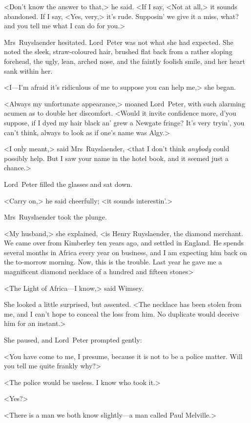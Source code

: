 <Don't know the answer to that,> he said. <If I say, <Not at all,> it sounds abandoned. If I say, <Yes, very,> it's rude. Supposin' we give it a miss, what? and you tell me what I can do for you.>

Mrs~Ruyslaender hesitated. Lord~Peter was not what she had expected. She noted the sleek, straw-coloured hair, brushed flat back from a rather sloping forehead, the ugly, lean, arched nose, and the faintly foolish smile, and her heart sank within her.

<I—I'm afraid it's ridiculous of me to suppose you can help me,> she began.

<Always my unfortunate appearance,> moaned Lord~Peter, with such alarming acumen as to double her discomfort. <Would it invite confidence more, d'you suppose, if I dyed my hair black an' grew a Newgate fringe? It's very tryin', you can't think, always to look as if one's name was Algy.>

<I only meant,> said Mrs~Ruyslaender, <that I don't think \emph{anybody} could possibly help. But I saw your name in the hotel book, and it seemed just a chance.>

Lord~Peter filled the glasses and sat down.

<Carry on,> he said cheerfully; <it sounds interestin'.>

Mrs~Ruyslaender took the plunge.

<My husband,> she explained, <is Henry Ruyslaender, the diamond merchant. We came over from Kimberley ten years ago, and settled in England. He spends several months in Africa every year on business, and I am expecting him back on the  to-morrow morning. Now, this is the trouble. Last year he gave me a magnificent diamond necklace of a hundred and fifteen stones\longdash>

<The Light of Africa—I know,> said Wimsey.

She looked a little surprised, but assented. <The necklace has been stolen from me, and I can't hope to conceal the loss from him. No duplicate would deceive him for an instant.>

She paused, and Lord~Peter prompted gently:

<You have come to me, I presume, because it is not to be a police matter. Will you tell me quite frankly why?>

<The police would be useless. I know who took it.>

<Yes?>

<There is a man we both know slightly—a man called Paul Melville.>

